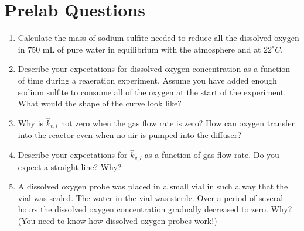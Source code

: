 \documentclass[letterpaper,10pt,english]{sphinxmanual}
\begin{document}
\section{Prelab Questions}
\label{\detokenize{Gas_Transfer/Gas_Transfer:prelab-questions}}\label{\detokenize{Gas_Transfer/Gas_Transfer:heading-gas-transfer-pre-laboratory-questions}}\begin{enumerate}
\item {} 
Calculate the mass of sodium sulfite needed to reduce all the dissolved oxygen in 750 mL of pure water in equilibrium with the atmosphere and at \(22^\circ C\).

\item {} 
Describe your expectations for dissolved oxygen concentration as a function of time during a reaeration experiment.  Assume you have added enough sodium sulfite to consume all of the oxygen at the start of the experiment. What would the shape of the curve look like?

\item {} 
Why is \(\hat{k}_{v,l}\) not zero when the gas flow rate is zero? How can oxygen transfer into the reactor even when no air is pumped into the diffuser?

\item {} 
Describe your expectations for \(\hat{k}_{v,l}\) as a function of gas flow rate. Do you expect a straight line? Why?

\item {} 
A dissolved oxygen probe was placed in a small vial in such a way that the vial was sealed. The water in the vial was sterile. Over a period of several hours the dissolved oxygen concentration gradually decreased to zero. Why? (You need to know how dissolved oxygen probes work!)

\end{enumerate}
\end{document}
